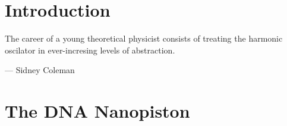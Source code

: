\documentclass[11pt,a4paper,twoside]{vutinfth}
\newcounter{theo}[section] \setcounter{theo}{0}
\begin{document}

\newcommand\mycommfont[1]{\small\ttfamily\textcolor{blue}{#1}}

\frontmatter
\rmfamily

 \cleardoublepage
 \cleardoublepage
\setcounter{page}{0}

\cleardoublepage
 \cleardoublepage
\printglossaries \cleardoublepage
\listoffigures \cleardoublepage
\listoftables \cleardoublepage
\linespread{0.816}
{\small \tableofcontents}
\cleardoublepage
\linespread{1}

\mainmatter
\setcounter{page}{0}

\chapter{Introduction}
\epigraph{The career of a young theoretical physicist consists of treating the harmonic
oscilator in ever-incresing levels of abstraction.}
{--- \textup{Sidney Coleman}}






\cleardoublepage
\chapter{The DNA Nanopiston}



\end{document}
